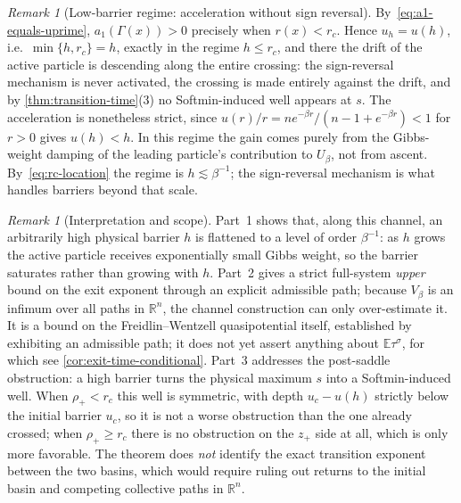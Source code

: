 \documentclass{article}
\theoremstyle{plain}
\theoremstyle{definition}
\theoremstyle{remark}
\newtheorem{remark}[theorem]{Remark}
\newcommand{\R}{\mathbb{R}}
\newcommand{\E}{\mathbb{E}}
\begin{document}
\begin{remark}[Low-barrier regime: acceleration without sign reversal]
\label{rem:low-barrier}
By~\eqref{eq:a1-equals-uprime}, \(a_1(\Gamma(x))>0\) precisely when \(r(x)<r_c\). Hence \(u_h=u(h)\), i.e.\ \(\min\{h,r_c\}=h\), exactly in the regime \(h\le r_c\), and there the drift of the active particle is descending along the entire crossing: the sign-reversal mechanism is never activated, the crossing is made entirely against the drift, and by \ref{thm:transition-time}(3) no Softmin-induced well appears at \(s\). The acceleration is nonetheless strict, since \(u(r)/r=ne^{-\beta r}/(n-1+e^{-\beta r})<1\) for \(r>0\) gives \(u(h)<h\). In this regime the gain comes purely from the Gibbs-weight damping of the leading particle's contribution to \(U_\beta\), not from ascent. By~\eqref{eq:rc-location} the regime is \(h\lesssim\beta^{-1}\); the sign-reversal mechanism is what handles barriers beyond that scale.
\end{remark}
 
\begin{remark}[Interpretation and scope]
\label{rem:scope}
Part~1 shows that, along this channel, an arbitrarily high physical barrier \(h\) is flattened to a level of order \(\beta^{-1}\): as \(h\) grows the active particle receives exponentially small Gibbs weight, so the barrier saturates rather than growing with \(h\). Part~2 gives a strict full-system \emph{upper} bound on the exit exponent through an explicit admissible path; because \(V_\beta\) is an infimum over all paths in \(\R^n\), the channel construction can only over-estimate it. %
It is a bound on the Freidlin--Wentzell quasipotential itself, established by exhibiting an admissible path; it does not yet assert anything about \(\E\tau^\sigma\), for which see \ref{cor:exit-time-conditional}. Part~3 addresses the post-saddle obstruction: a high barrier turns the physical maximum \(s\) into a Softmin-induced well. When \(\rho_+<r_c\) this well is symmetric, with depth \(u_c-u(h)\) strictly below the initial barrier \(u_c\), so it is not a worse obstruction than the one already crossed; when \(\rho_+\ge r_c\) there is no obstruction on the \(z_+\) side at all, which is only more favorable. The theorem does \emph{not} identify the exact transition exponent between the two basins, which would require ruling out returns to the initial basin and competing collective paths in \(\R^n\).
\end{remark}
 
\end{document}
